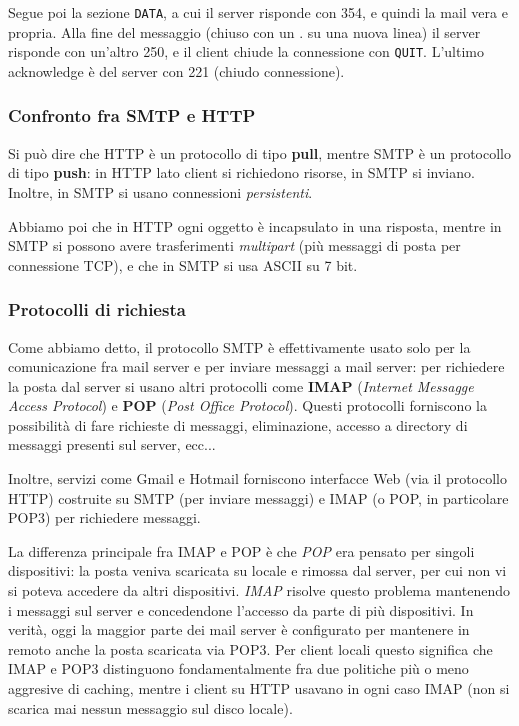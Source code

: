 \documentclass[a4paper,11pt]{article}
\begin{document}
Segue poi la sezione \lstinline|DATA|, a cui il server risponde con 354, e quindi la mail vera e propria.
Alla fine del messaggio (chiuso con un . su una nuova linea) il server risponde con un'altro 250, e il client chiude la connessione con \lstinline|QUIT|. L'ultimo acknowledge è del server con 221 (chiudo connessione).

\subsubsection{Confronto fra SMTP e HTTP}
Si può dire che HTTP è un protocollo di tipo \textbf{pull}, mentre SMTP è un protocollo di tipo \textbf{push}: in HTTP lato client si richiedono risorse, in SMTP si inviano.
Inoltre, in SMTP si usano connessioni \textit{persistenti}.

Abbiamo poi che in HTTP ogni oggetto è incapsulato in una risposta, mentre in SMTP si possono avere trasferimenti \textit{multipart} (più messaggi di posta per connessione TCP), e che in SMTP si usa ASCII su 7 bit.

\subsubsection{Protocolli di richiesta}
Come abbiamo detto, il protocollo SMTP è effettivamente usato solo per la comunicazione fra mail server e per inviare messaggi a mail server: per richiedere la posta dal server si usano altri protocolli come \textbf{IMAP} (\textit{Internet Messagge Access Protocol}) e \textbf{POP} (\textit{Post Office Protocol}).
Questi protocolli forniscono la possibilità di fare richieste di messaggi, eliminazione, accesso a directory di messaggi presenti sul server, ecc...

Inoltre, servizi come Gmail e Hotmail forniscono interfacce Web (via il protocollo HTTP) costruite su SMTP (per inviare messaggi) e IMAP (o POP, in particolare POP3) per richiedere messaggi. 

La differenza principale fra IMAP e POP è che \textit{POP} era pensato per singoli dispositivi: la posta veniva scaricata su locale e rimossa dal server, per cui non vi si poteva accedere da altri dispositivi.
\textit{IMAP} risolve questo problema mantenendo i messaggi sul server e concedendone l'accesso da parte di più dispositivi.
In verità, oggi la maggior parte dei mail server è configurato per mantenere in remoto anche la posta scaricata via POP3.
Per client locali questo significa che IMAP e POP3 distinguono fondamentalmente fra due politiche più o meno aggresive di caching, mentre i client su HTTP usavano in ogni caso IMAP (non si scarica mai nessun messaggio sul disco locale).
\end{document}
